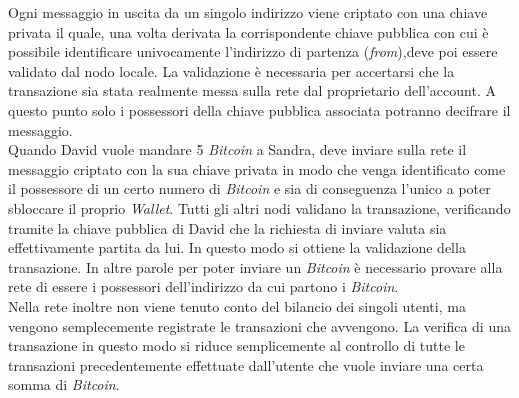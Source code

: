 \documentclass[11pt]{thesistemp}
\begin{document}
Ogni messaggio in uscita da un singolo indirizzo viene criptato con una chiave privata il quale, una volta derivata la corrispondente chiave pubblica con cui è possibile identificare univocamente l'indirizzo di partenza (\textit{from}),deve poi essere validato dal nodo locale.
La validazione è necessaria per accertarsi che la transazione sia stata realmente messa sulla rete dal proprietario dell'account.
A questo punto solo i possessori della chiave pubblica associata potranno decifrare il messaggio.\\
Quando David vuole mandare 5 \textit{Bitcoin} a Sandra, deve inviare sulla rete il messaggio criptato con la sua chiave privata in modo che venga identificato come il possessore di un certo numero di \textit{Bitcoin} e sia di conseguenza l’unico a poter sbloccare il proprio \textit{Wallet}.
Tutti gli altri nodi validano la transazione, verificando tramite la chiave pubblica di David che la richiesta di inviare valuta sia effettivamente partita da lui.
In questo modo si ottiene la validazione della transazione.
In altre parole per poter inviare un \textit{Bitcoin} è necessario provare alla rete di essere i possessori dell'indirizzo da cui partono i \textit{Bitcoin}.\\
Nella rete inoltre non viene tenuto conto del bilancio dei singoli utenti, ma vengono semplecemente registrate le transazioni che avvengono.
La verifica di una transazione in questo modo si riduce semplicemente al controllo di tutte le transazioni precedentemente effettuate dall’utente che vuole inviare una certa somma di \textit{Bitcoin}.
\end{document}
